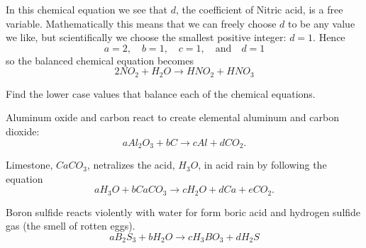 In this chemical equation we see that $d$, the coefficient of Nitric acid, is a free
variable.  Mathematically this means that we can freely choose $d$ to be any value we
like, but scientifically we choose the smallest positive integer: $d=1$.  Hence
\[ a=2, \quad b=1, \quad c=1, \quad \text{and} \quad d=1 \]
so the balanced chemical equation becomes
\[ 2NO_2 + H_2O \to HNO_2 + HNO_3 \]

% 
\begin{lab}
Find the lower case values that balance each of the chemical equations.
\ba
    \item Aluminum oxide and carbon react to create elemental aluminum and carbon dioxide:
        \[ a Al_2O_3 + b C \to c Al + d CO_2. \]
    \item Limestone, $CaCO_3$, netralizes the acid, $H_3O$, in acid rain by following the
        equation
        \[ a H_3O + b CaCO_3 \to c H_2O + d Ca + e CO_2. \]
    \item Boron sulfide reacts violently with water for form boric acid and hydrogen
        sulfide gas (the smell of rotten eggs). 
        \[ a B_2 S_3 + b H_2O \to c H_3 BO_3 + d H_2 S \]
\ea
\end{lab}
